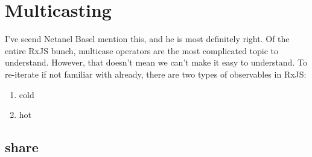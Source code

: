 \chapter{Multicasting}
I've seend Netanel Basel mention this, and he is most definitely right. Of the
entire RxJS bunch, multicase operators are the most complicated topic to 
understand. However, that doesn't mean we can't make it easy to understand. To 
re-iterate if not familiar with already, there are two types of observables in 
RxJS: 
\begin{enumerate}
  \item cold 
  \item hot
\end{enumerate}

\section{share}
